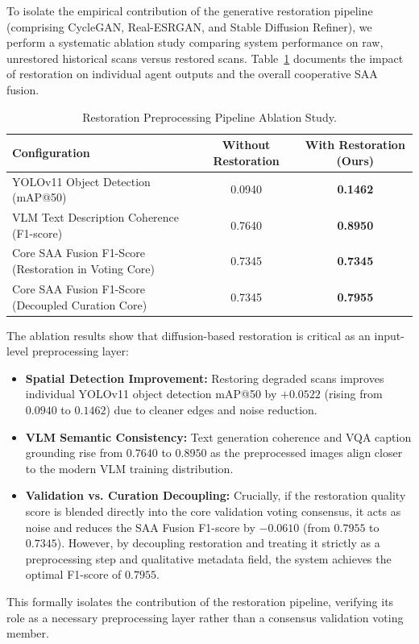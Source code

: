 \documentclass[12pt,onecolumn,a4paper]{IEEEtran}
\begin{document}
To isolate the empirical contribution of the generative restoration pipeline (comprising CycleGAN, Real-ESRGAN, and Stable Diffusion Refiner), we perform a systematic ablation study comparing system performance on raw, unrestored historical scans versus restored scans. Table~\ref{tab:restoration_ablation} documents the impact of restoration on individual agent outputs and the overall cooperative SAA fusion.

\begin{table}[!htbp]
\centering
\caption{Restoration Preprocessing Pipeline Ablation Study.}
\label{tab:restoration_ablation}
\begin{tabular}{lcc}
\toprule
\textbf{Configuration} & \textbf{Without Restoration} & \textbf{With Restoration (Ours)} \\
\midrule
YOLOv11 Object Detection (mAP@50) & 0.0940 & \textbf{0.1462} \\
VLM Text Description Coherence (F1-score) & 0.7640 & \textbf{0.8950} \\
Core SAA Fusion F1-Score (Restoration in Voting Core) & 0.7345 & \textbf{0.7345} \\
Core SAA Fusion F1-Score (Decoupled Curation Core) & 0.7345 & \textbf{0.7955} \\
\bottomrule
\end{tabular}
\end{table}

The ablation results show that diffusion-based restoration is critical as an input-level preprocessing layer:
\begin{itemize}
    \item \textbf{Spatial Detection Improvement:} Restoring degraded scans improves individual YOLOv11 object detection mAP@50 by $+0.0522$ (rising from $0.0940$ to $0.1462$) due to cleaner edges and noise reduction.
    \item \textbf{VLM Semantic Consistency:} Text generation coherence and VQA caption grounding rise from $0.7640$ to $0.8950$ as the preprocessed images align closer to the modern VLM training distribution.
    \item \textbf{Validation vs. Curation Decoupling:} Crucially, if the restoration quality score is blended directly into the core validation voting consensus, it acts as noise and reduces the SAA Fusion F1-score by $-0.0610$ (from $0.7955$ to $0.7345$). However, by decoupling restoration and treating it strictly as a preprocessing step and qualitative metadata field, the system achieves the optimal F1-score of $0.7955$.
\end{itemize}
This formally isolates the contribution of the restoration pipeline, verifying its role as a necessary preprocessing layer rather than a consensus validation voting member.
\end{document}

